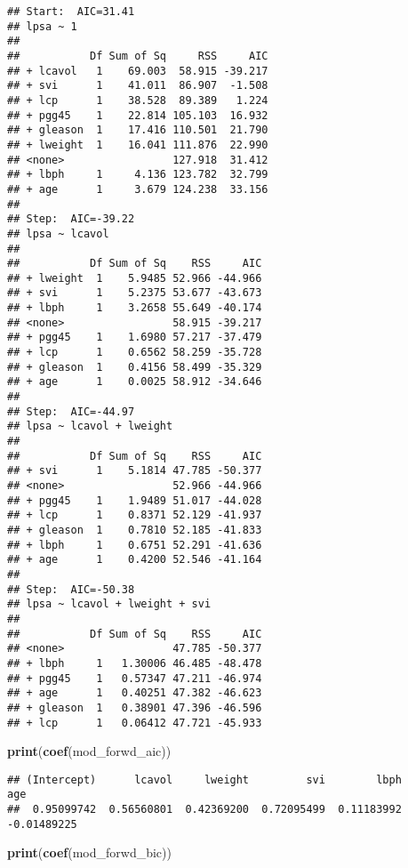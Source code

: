 \documentclass[
]{article}
\newenvironment{Shaded}{\begin{snugshade}}{\end{snugshade}}
\newcommand{\FunctionTok}[1]{\textcolor[rgb]{0.13,0.29,0.53}{\textbf{#1}}}
\newcommand{\NormalTok}[1]{#1}
\begin{document}
\begin{enumerate}
\begin{verbatim}
## Start:  AIC=31.41
## lpsa ~ 1
## 
##           Df Sum of Sq     RSS     AIC
## + lcavol   1    69.003  58.915 -39.217
## + svi      1    41.011  86.907  -1.508
## + lcp      1    38.528  89.389   1.224
## + pgg45    1    22.814 105.103  16.932
## + gleason  1    17.416 110.501  21.790
## + lweight  1    16.041 111.876  22.990
## <none>                 127.918  31.412
## + lbph     1     4.136 123.782  32.799
## + age      1     3.679 124.238  33.156
## 
## Step:  AIC=-39.22
## lpsa ~ lcavol
## 
##           Df Sum of Sq    RSS     AIC
## + lweight  1    5.9485 52.966 -44.966
## + svi      1    5.2375 53.677 -43.673
## + lbph     1    3.2658 55.649 -40.174
## <none>                 58.915 -39.217
## + pgg45    1    1.6980 57.217 -37.479
## + lcp      1    0.6562 58.259 -35.728
## + gleason  1    0.4156 58.499 -35.329
## + age      1    0.0025 58.912 -34.646
## 
## Step:  AIC=-44.97
## lpsa ~ lcavol + lweight
## 
##           Df Sum of Sq    RSS     AIC
## + svi      1    5.1814 47.785 -50.377
## <none>                 52.966 -44.966
## + pgg45    1    1.9489 51.017 -44.028
## + lcp      1    0.8371 52.129 -41.937
## + gleason  1    0.7810 52.185 -41.833
## + lbph     1    0.6751 52.291 -41.636
## + age      1    0.4200 52.546 -41.164
## 
## Step:  AIC=-50.38
## lpsa ~ lcavol + lweight + svi
## 
##           Df Sum of Sq    RSS     AIC
## <none>                 47.785 -50.377
## + lbph     1   1.30006 46.485 -48.478
## + pgg45    1   0.57347 47.211 -46.974
## + age      1   0.40251 47.382 -46.623
## + gleason  1   0.38901 47.396 -46.596
## + lcp      1   0.06412 47.721 -45.933
\end{verbatim}

\begin{Shaded}
\begin{Highlighting}[]
\FunctionTok{print}\NormalTok{(}\FunctionTok{coef}\NormalTok{(mod\_forwd\_aic))}
\end{Highlighting}
\end{Shaded}

\begin{verbatim}
## (Intercept)      lcavol     lweight         svi        lbph         age 
##  0.95099742  0.56560801  0.42369200  0.72095499  0.11183992 -0.01489225
\end{verbatim}

\begin{Shaded}
\begin{Highlighting}[]
\FunctionTok{print}\NormalTok{(}\FunctionTok{coef}\NormalTok{(mod\_forwd\_bic))}
\end{Highlighting}
\end{Shaded}


\end{enumerate}
\end{document}
